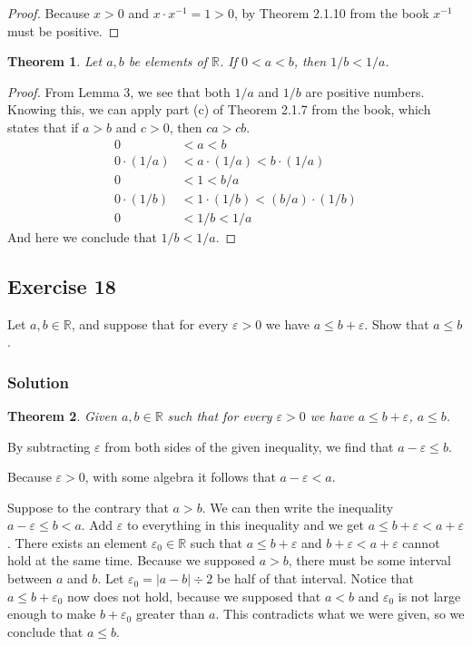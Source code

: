 \documentclass[12pt]{article}
\newtheorem*{thm}{Theorem}
\begin{document}
\begin{proof}
Because $x > 0$ and $x \cdot x^{-1} = 1 > 0$, by Theorem 2.1.10 from the book $x^{-1}$ must be positive.
\end{proof}

\begin{thm}
Let $a, b$ be elements of $\mathbb{R}$. If $0 < a < b$, then $1/b < 1/a$.
\end{thm}

\begin{proof}
From Lemma 3, we see that both $1/a$ and $1/b$ are positive numbers. Knowing this, we can apply part (c) of Theorem 2.1.7 from the book, which states that if $a > b$ and $c > 0$, then $ca > cb$.
\begin{align*}
0 &< a < b \\
0\cdot\left(1/a\right) &< a\cdot\left(1/a\right) < b\cdot\left(1/a\right) \\
0 &< 1 < b / a \\
0\cdot\left(1/b\right) &< 1\cdot\left(1/b\right) < \left(b / a\right)\cdot\left(1 / b\right)\\
0 &< 1/b < 1/a
\end{align*}
And here we conclude that $1 / b < 1 / a$.
\end{proof}

\subsection*{Exercise 18}
Let $a, b \in \mathbb{R}$, and suppose that for every $\varepsilon > 0$ we have $a \leq b + \varepsilon$. Show that $a \leq b$.

\subsubsection*{Solution}
\begin{thm}
Given $a, b \in \mathbb{R}$ such that for every $\varepsilon > 0$ we have $a \leq b + \varepsilon$, $a \leq b$.
\end{thm}

By subtracting $\varepsilon$ from both sides of the given inequality, we find that $a - \varepsilon \leq b$.

Because $\varepsilon > 0$, with some algebra it follows that $a - \varepsilon < a$.

Suppose to the contrary that $a > b$. We can then write the inequality $a - \varepsilon \leq b < a$. Add $\varepsilon$ to everything in this inequality and we get $a \leq b + \varepsilon < a + \varepsilon$. There exists an element $\varepsilon_0 \in \mathbb{R}$ such that $a \leq b + \varepsilon$ and $b + \varepsilon < a + \varepsilon$ cannot hold at the same time. Because we supposed $a > b$, there must be some interval between $a$ and $b$. Let $\varepsilon_0 = \left|a - b\right| \div 2$ be half of that interval. Notice that $a \leq b + \varepsilon_0$ now does not hold, because we supposed that $a < b$ and $\varepsilon_0$ is not large enough to make $b + \varepsilon_0$ greater than $a$. This contradicts what we were given, so we conclude that $a \leq b$.
\end{document}
